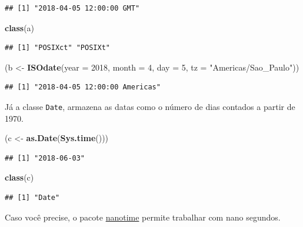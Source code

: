 \documentclass[]{book}
\newenvironment{Shaded}{\begin{snugshade}}{\end{snugshade}}
\newcommand{\KeywordTok}[1]{\textcolor[rgb]{0.13,0.29,0.53}{\textbf{#1}}}
\newcommand{\DataTypeTok}[1]{\textcolor[rgb]{0.13,0.29,0.53}{#1}}
\newcommand{\DecValTok}[1]{\textcolor[rgb]{0.00,0.00,0.81}{#1}}
\newcommand{\StringTok}[1]{\textcolor[rgb]{0.31,0.60,0.02}{#1}}
\newcommand{\NormalTok}[1]{#1}
\theoremstyle{definition}
\theoremstyle{definition}
\theoremstyle{definition}
\theoremstyle{remark}
\begin{document}
\begin{verbatim}
## [1] "2018-04-05 12:00:00 GMT"
\end{verbatim}

\begin{Shaded}
\begin{Highlighting}[]
\KeywordTok{class}\NormalTok{(a)}
\end{Highlighting}
\end{Shaded}

\begin{verbatim}
## [1] "POSIXct" "POSIXt"
\end{verbatim}

\begin{Shaded}
\begin{Highlighting}[]
\NormalTok{(b <-}\StringTok{ }\KeywordTok{ISOdate}\NormalTok{(}\DataTypeTok{year =} \DecValTok{2018}\NormalTok{, }\DataTypeTok{month =} \DecValTok{4}\NormalTok{, }\DataTypeTok{day =} \DecValTok{5}\NormalTok{, }\DataTypeTok{tz =} \StringTok{"Americas/Sao_Paulo"}\NormalTok{))}
\end{Highlighting}
\end{Shaded}

\begin{verbatim}
## [1] "2018-04-05 12:00:00 Americas"
\end{verbatim}

Já a classe \texttt{Date}, armazena as datas como o número de dias
contados a partir de 1970.

\begin{Shaded}
\begin{Highlighting}[]
\NormalTok{(c <-}\StringTok{ }\KeywordTok{as.Date}\NormalTok{(}\KeywordTok{Sys.time}\NormalTok{()))}
\end{Highlighting}
\end{Shaded}

\begin{verbatim}
## [1] "2018-06-03"
\end{verbatim}

\begin{Shaded}
\begin{Highlighting}[]
\KeywordTok{class}\NormalTok{(c)}
\end{Highlighting}
\end{Shaded}

\begin{verbatim}
## [1] "Date"
\end{verbatim}

Caso você precise, o pacote
\href{https://github.com/eddelbuettel/nanotime}{nanotime} permite
trabalhar com nano segundos.
\end{document}
